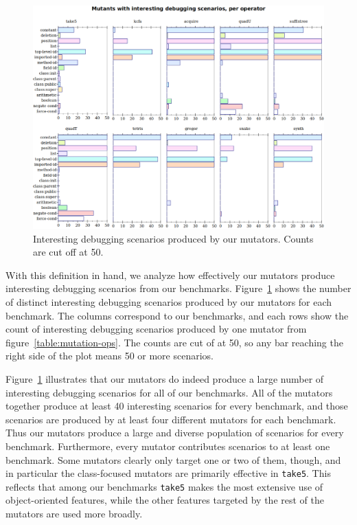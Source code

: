 \begin{figure}
  \centering
  \includegraphics[scale=0.35]{./plots/mutant-breakdown}
  \caption{Interesting debugging scenarios produced by our mutators. Counts are cut off at 50.}
  \label{fig:mutant-breakdown}
\end{figure}


With this definition in hand, we analyze how effectively our mutators produce interesting debugging scenarios from our benchmarks.
Figure~\ref{fig:mutant-breakdown} shows the number of distinct interesting debugging scenarios produced by our mutators for each benchmark.
The columns correspond to our benchmarks, and each rows show the count of interesting debugging scenarios produced by one mutator from figure~\ref{table:mutation-ops}.
The counts are cut of at 50, so any bar reaching the right side of the plot means 50 or more scenarios.

Figure~\ref{fig:mutant-breakdown} illustrates that our mutators do indeed produce a large number of interesting debugging scenarios for all of our benchmarks.
All of the mutators together produce at least 40 interesting scenarios for every benchmark, and those scenarios are produced by at least four different mutators for each benchmark.
Thus our mutators produce a large and diverse population of scenarios for every benchmark.
Furthermore, every mutator contributes scenarios to at least one benchmark.
Some mutators clearly only target one or two of them, though, and in particular the class-focused mutators are primarily effective in \texttt{take5}.
This reflects that among our benchmarks \texttt{take5} makes the most extensive use of object-oriented features, while the other features targeted by the rest of the mutators are used more broadly.
